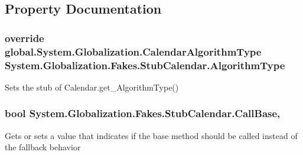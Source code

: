 \subsection{Property Documentation}
\hypertarget{class_system_1_1_globalization_1_1_fakes_1_1_stub_calendar_a0b7b3e1f0b1b59876f8a3709a3c4c41e}{
\subsubsection[{Algorithm\-Type}]{\setlength{\rightskip}{0pt plus 5cm}override global.\-System.\-Globalization.\-Calendar\-Algorithm\-Type System.\-Globalization.\-Fakes.\-Stub\-Calendar.\-Algorithm\-Type\hspace{0.3cm}{\ttfamily [get]}}}\label{class_system_1_1_globalization_1_1_fakes_1_1_stub_calendar_a0b7b3e1f0b1b59876f8a3709a3c4c41e}


Sets the stub of Calendar.\-get\-\_\-\-Algorithm\-Type()

\hypertarget{class_system_1_1_globalization_1_1_fakes_1_1_stub_calendar_a89b849c020dcb54624e9dee06c363d56}{
\subsubsection[{Call\-Base}]{\setlength{\rightskip}{0pt plus 5cm}bool System.\-Globalization.\-Fakes.\-Stub\-Calendar.\-Call\-Base\hspace{0.3cm}{\ttfamily [get]}, {\ttfamily [set]}}}\label{class_system_1_1_globalization_1_1_fakes_1_1_stub_calendar_a89b849c020dcb54624e9dee06c363d56}


Gets or sets a value that indicates if the base method should be called instead of the fallback behavior

